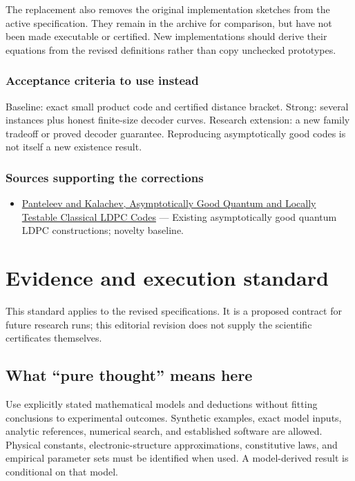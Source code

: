 \documentclass[
  11pt,
]{article}
\providecommand{\tightlist}{%
  \setlength{\itemsep}{0pt}\setlength{\parskip}{0pt}}
\begin{document}
The replacement also removes the original implementation sketches from
the active specification. They remain in the archive for comparison, but
have not been made executable or certified. New implementations should
derive their equations from the revised definitions rather than copy
unchecked prototypes.

\subsubsection{Acceptance criteria to use instead}

Baseline: exact small product code and certified distance bracket.
Strong: several instances plus honest finite-size decoder curves.
Research extension: a new family tradeoff or proved decoder guarantee.
Reproducing asymptotically good codes is not itself a new existence
result.

\subsubsection{Sources supporting the corrections}

\begin{itemize}
\tightlist
\item
  \href{https://arxiv.org/abs/2111.03654}{Panteleev and Kalachev,
  Asymptotically Good Quantum and Locally Testable Classical LDPC Codes}
  --- Existing asymptotically good quantum LDPC constructions; novelty
  baseline.
\end{itemize}

\section{Evidence and execution standard}

This standard applies to the revised specifications. It is a proposed
contract for future research runs; this editorial revision does not
supply the scientific certificates themselves.

\subsection{What ``pure thought'' means here}

Use explicitly stated mathematical models and deductions without fitting
conclusions to experimental outcomes. Synthetic examples, exact model
inputs, analytic references, numerical search, and established software
are allowed. Physical constants, electronic-structure approximations,
constitutive laws, and empirical parameter sets must be identified when
used. A model-derived result is conditional on that model.
\end{document}

